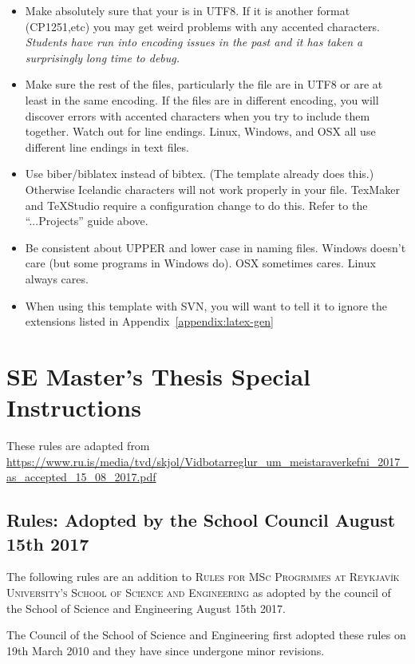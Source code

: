 \begin{itemize}
\item Make absolutely sure that your  is in UTF8.  If it is another format (CP1251,etc) you may get weird problems with any accented characters.
  {\em Students have run into encoding issues in the past and it has taken a surprisingly long time to debug.}

\item Make sure the rest of the files, particularly the  file are in UTF8 or are at least in the same encoding.
  If the files are in different encoding, you will discover errors with accented characters when you try to include them together.
  Watch out for line endings. Linux, Windows, and OSX all use different line endings in text files.

\item Use biber/biblatex instead of bibtex.
(The template already does this.)
Otherwise Icelandic characters will not work properly in your  file.
TexMaker and TeXStudio require a configuration change to do this.
Refer to the ``...Projects'' guide above.

\item Be consistent about UPPER and lower case in naming files.
  Windows doesn't care (but some programs in Windows do).
  OSX sometimes cares.
  Linux always cares.
\item When using this template with SVN, you will want to tell it to ignore the extensions listed in Appendix~\ref{appendix:latex-gen}
\end{itemize}

\section{SE Master's Thesis Special Instructions}
These rules are adapted from \url{https://www.ru.is/media/tvd/skjol/Vidbotarreglur_um_meistaraverkefni_2017_as_accepted_15_08_2017.pdf}
\subsection{Rules: Adopted by the School Council August 15th 2017}
The following rules are an addition to \textsc{Rules for MSc Progrmmes at Reykjavík University's School of Science and Engineering}
as adopted by the council of the School of Science and Engineering August 15th 2017.

The Council of the School of Science and Engineering first adopted these rules on 19th March 2010 and they have since undergone minor revisions.

